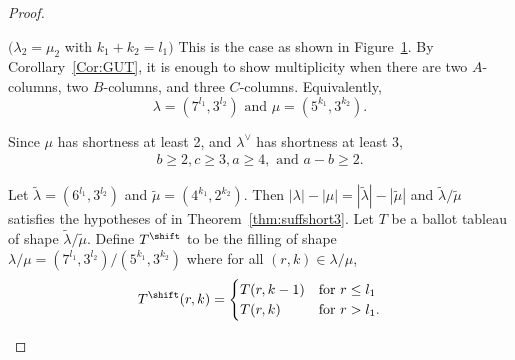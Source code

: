 \begin{proof}
\begin{Case}
\end{Case}

\begin{Case}
{ $(\lambda_2 = \mu_2$ with $k_1 + k_2 = l_1)$} 
This is the case as shown in Figure~\ref{Case4}. By Corollary~\ref{Cor:GUT}, it is enough to show multiplicity when there are two $A$-columns, two $B$-columns, and three $C$-columns. Equivalently, 
\[
 \lambda = (7^{l_1},3^{l_2})\text{ and } \mu=(5^{k_1},3^{k_2}). 
\]

Since $\mu$ has shortness at least 2, and $\lambda^\vee$ has shortness at least 3,
\begin{align}\label{ineq1:case4}
 b\geq 2, c\geq 3, a\geq 4, \text{ and } a-b \geq 2.
\end{align}


Let $\tilde\lambda = (6^{l_1},3^{l_2})$ and $\tilde\mu = (4^{k_1},2^{k_2})$. Then $|\lambda| - |\mu| = |\tilde\lambda| - |\tilde\mu|$ and $\tilde\lambda/\tilde\mu$ satisfies the hypotheses of  in Theorem~\ref{thm:suffshort3}. Let $T$ be a ballot tableau of shape $\tilde\lambda/\tilde\mu$. Define $T^{\shift }$ to be the filling of shape $\lambda / \mu = (7^{l_1},3^{l_2}) / (5^{k_1},3^{k_2})$ where for all $(r,k) \in \lambda / \mu$, 
\begin{equation*}
T^{\shift }(r,k) = \begin{cases} T(r,k-1) & \text{for }r \leq l_1 \\ T(r,k) & \text{for }r > l_1. \end{cases}
\end{equation*}

\begin{figure}[htb]\centering
 \caption[Case 4]{}
 \label{Case4}
\end{figure}



\end{Case}
\end{proof}
